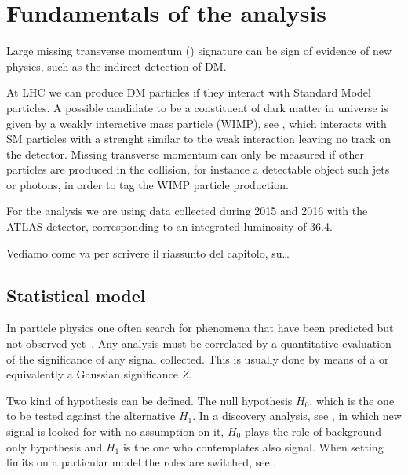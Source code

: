 \chapter{Fundamentals of the \mph analysis}
\label{chapt:mph}
\lettrine{L}{}arge missing transverse momentum (\met) signature can be sign of evidence of new physics, such as the indirect detection of DM.

At LHC we can produce DM particles if they interact with Standard Model particles. A possible candidate to be a constituent of dark matter in universe is given by a weakly interactive mass particle (WIMP), see \Sect{\ref{sec:wimp}}, which interacts with SM particles with a strenght similar to the weak interaction leaving no track on the detector. Missing transverse momentum can only be measured if other particles are produced in the collision, for instance a detectable object such jets or photons, in order to tag the WIMP particle production. 

For the analysis we are using data collected during 2015 and 2016 with the ATLAS detector, corresponding to an integrated luminosity of \SI{36.4}{\ifb}.

Vediamo come va per scrivere il riassunto del capitolo, su\dots

\section{Statistical model}
In particle physics one often search for phenomena that have been predicted but not observed yet~\cite{Cowan}. Any analysis must be correlated by a quantitative evaluation of the significance of any signal collected. This is usually done by means of a \p or equivalently a Gaussian significance \emph{Z}.

Two kind of hypothesis can be defined. The null hypothesis $H_{0}$, which is the one to be tested against the alternative $H_{1}$. In a discovery analysis, see , in which new signal is looked for with no assumption on it, $H_{0}$ plays the role of background only hypothesis and $H_{1}$ is the one who contemplates also signal. When setting limits on a particular model the roles are switched, see .


